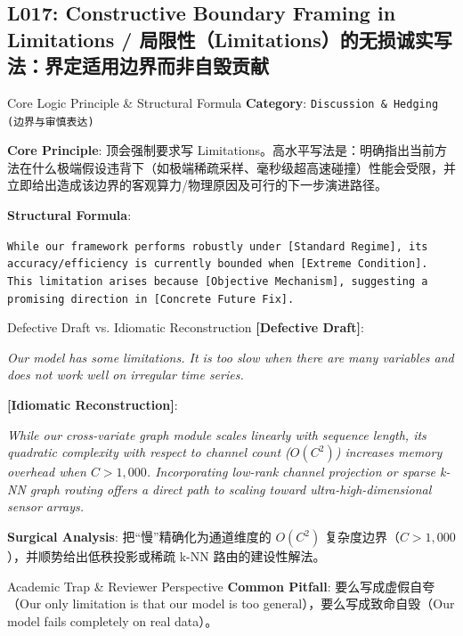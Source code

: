 \subsection{L017: Constructive Boundary Framing in Limitations / 局限性（Limitations）的无损诚实写法：界定适用边界而非自毁贡献}\label{sec:logic:L017}
\begin{ConceptBox}{Core Logic Principle \& Structural Formula}
\textbf{Category}: \texttt{Discussion \& Hedging (边界与审慎表达)}\par\vspace{3pt}
\textbf{Core Principle}: 顶会强制要求写 Limitations。高水平写法是：明确指出当前方法在什么极端假设违背下（如极端稀疏采样、毫秒级超高速碰撞）性能会受限，并立即给出造成该边界的客观算力/物理原因及可行的下一步演进路径。\par\vspace{4pt}
\textbf{Structural Formula}:\par\noindent\texttt{While our framework performs robustly under [Standard Regime], its accuracy/efficiency is currently bounded when [Extreme Condition]. This limitation arises because [Objective Mechanism], suggesting a promising direction in [Concrete Future Fix].}
\end{ConceptBox}
\begin{ExampleBox}{Defective Draft vs. Idiomatic Reconstruction}
\textbf{\color{TargetHighlight}[Defective Draft]}:\par\textit{Our model has some limitations. It is too slow when there are many variables and does not work well on irregular time series.}\par\vspace{4pt}
\textbf{\color{AcadNavy}[Idiomatic Reconstruction]}:\par\textit{While our cross-variate graph module scales linearly with sequence length, its quadratic complexity with respect to channel count ($O(C^2)$) increases memory overhead when $C > 1,000$. Incorporating low-rank channel projection or sparse k-NN graph routing offers a direct path to scaling toward ultra-high-dimensional sensor arrays.}\par\vspace{4pt}
\textbf{Surgical Analysis}: 把“慢”精确化为通道维度的 $O(C^2)$ 复杂度边界（$C > 1,000$），并顺势给出低秩投影或稀疏 k-NN 路由的建设性解法。
\end{ExampleBox}
\begin{TipBox}{Academic Trap \& Reviewer Perspective}
\textbf{Common Pitfall}: 要么写成虚假自夸（Our only limitation is that our model is too general），要么写成致命自毁（Our model fails completely on real data）。
\end{TipBox}
\vspace{6pt}
